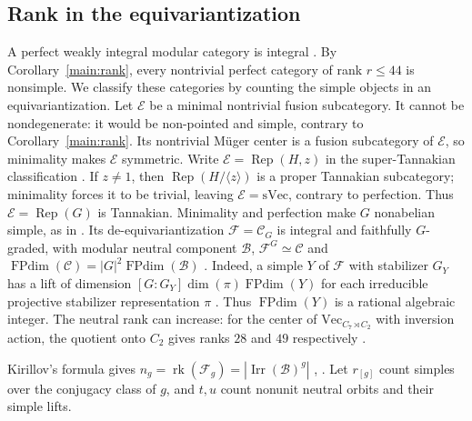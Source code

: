 \documentclass[11pt]{amsart}
\numberwithin{equation}{section}
\theoremstyle{definition}
\theoremstyle{plain}
\DeclareMathOperator{\FPdim}{FPdim}
\DeclareMathOperator{\Irr}{Irr}
\newcommand{\C}{\mathcal C}
\begin{document}
\subsection{Rank in the equivariantization}\label{ext:equiv-rank}
A perfect weakly integral modular category is integral
\cite[Proposition~10.11]{BPBurnside}.
By Corollary~\ref{main:rank}, every nontrivial perfect category
of rank $r\le44$ is nonsimple. We classify these categories by
counting the simple objects in an equivariantization.
Let $\mathcal E$ be a minimal nontrivial fusion subcategory. It cannot
be nondegenerate: it would be non-pointed and simple, contrary to
Corollary~\ref{main:rank}. Its nontrivial M\"uger center is a fusion
subcategory of $\mathcal E$, so minimality makes $\mathcal E$ symmetric.
Write $\mathcal E=\operatorname{Rep}(H,z)$ in the super-Tannakian
classification \cite[\S9.9]{EGNO}. If $z\ne1$, then
$\operatorname{Rep}(H/\langle z\rangle)$ is a proper Tannakian
subcategory; minimality forces it to be trivial, leaving
$\mathcal E=\mathrm{sVec}$, contrary to perfection. Thus
$\mathcal E=\operatorname{Rep}(G)$ is Tannakian. Minimality and
perfection make $G$ nonabelian simple, as in
\cite[Corollary~5.4]{LPR}. Its de-equivariantization
$\mathcal F=\C_G$ is integral and faithfully $G$-graded, with modular
neutral component $\mathcal B$, $\mathcal F^G\simeq\C$ and
$\FPdim(\C)=|G|^2\FPdim(\mathcal B)$
\cite[Propositions~2.21, 4.26, 4.56 and Corollary~4.27]{DGNO}.
Indeed, a simple $Y$ of $\mathcal F$ with stabilizer $G_Y$ has a lift
of dimension $[G:G_Y]\dim(\pi)\FPdim(Y)$ for each irreducible
projective stabilizer representation $\pi$ \cite[Corollary~2.13]{BN}.
Thus $\FPdim(Y)$ is a rational algebraic integer. The neutral rank can increase: for the center of $\mathrm{Vec}_{C_7\rtimes C_2}$
with inversion action, the quotient onto $C_2$ gives ranks $28$ and
$49$ respectively \cite[Corollary~3.7]{GNN}.

Kirillov's formula gives
$n_g=\operatorname{rk}(\mathcal F_g)=|\Irr(\mathcal B)^g|$
\cite[Lemma~10.7]{Kirillov}, \cite[Proposition~6]{JMNR}.
Let $r_{[g]}$ count simples over the conjugacy class of $g$,
and $t,u$ count nonunit neutral orbits and their simple lifts.
\end{document}
